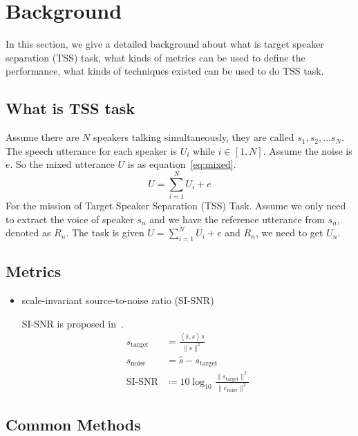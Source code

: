 

\section{Background}\label{sec:background}

In this section, we give a detailed background about what is target speaker separation (TSS) task, what kinds of metrics can be used to define the performance, what kinds of techniques existed can be used to do TSS task.

\subsection{What is TSS task}\label{subsec:what-is-tss-task}

Assume there are $N$ speakers talking simultaneously, they are called $s_1, s_2, \dots s_N$. The speech utterance for each speaker is $U_i$ while $i\in\left[ 1, N \right]$. Assume the noise is $e$.
So the mixed utterance $U$ is as equation~\ref{eq:mixed}.
\begin{equation}
    U = \sum\limits_{i=1}^N U_i + e\label{eq:mixed}
\end{equation}
For the mission of Target Speaker Separation (TSS) Task. Assume we only need to extract the voice of speaker $s_n$ and we have the reference utterance from $s_n$, denoted as $R_n$.
The task is given $U = \sum\limits_{i=1}^N U_i + e$ and $R_n$, we need to get $U_n$.

\subsection{Metrics}\label{subsec:metrics}
\begin{itemize}
    \item scale-invariant source-to-noise ratio (SI-SNR)

    SI-SNR is proposed in~\cite{tasnet}.
    \begin{equation}
        \begin{aligned}
            s_{\text{target}} &= \frac{\left< \hat{s}, s \right>s}{\| s \|^2} \\
            s_{\text{noise}} &= \hat{s} - s_{\text{target}} \\
            \text{SI-SNR} &\coloneqq 10\log_{10}\frac{\| s_{\text{target}} \|^2}{\| e_{\text{noise}} \|^2}
        \end{aligned}\label{eq:si-snr}
    \end{equation}
\end{itemize}

\subsection{Common Methods}\label{subsec:common-methods}
